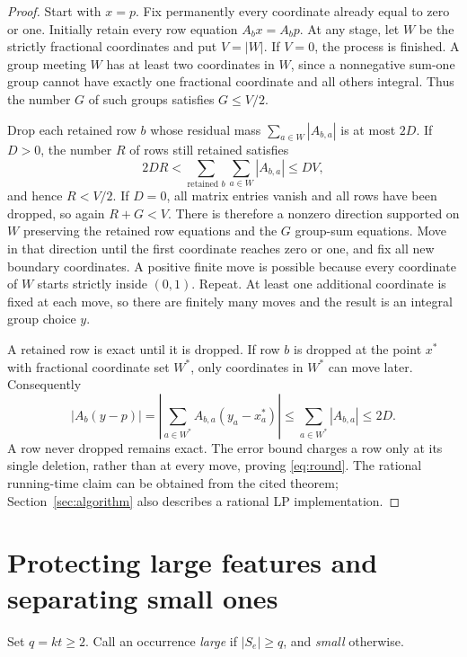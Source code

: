 \documentclass[acmsmall,11pt,nonacm]{acmart}
\begin{document}
\begin{proof}
Start with $x=p$. Fix permanently every coordinate already equal to zero
or one. Initially retain every row equation $A_bx=A_bp$. At any stage,
let $W$ be the strictly fractional coordinates and put $V=|W|$. If
$V=0$, the process is finished. A group meeting $W$ has at least two
coordinates in $W$, since a nonnegative sum-one group cannot have exactly
one fractional coordinate and all others integral. Thus the number $G$
of such groups satisfies $G\le V/2$.

Drop each retained row $b$ whose residual mass
$\sum_{a\in W}|A_{b,a}|$ is at most $2D$. If $D>0$, the number $R$ of
rows still retained satisfies
\[
 2DR < \sum_{\text{retained }b}\sum_{a\in W}|A_{b,a}|
       \le DV,
\]
and hence $R<V/2$. If $D=0$, all matrix entries vanish and all rows have
been dropped, so again $R+G<V$. There is therefore a nonzero direction
supported on $W$ preserving the retained row equations and the $G$
group-sum equations. Move in that direction until the first coordinate
reaches zero or one, and fix all new boundary coordinates. A positive
finite move is possible because every coordinate of $W$ starts strictly
inside $(0,1)$. Repeat. At least one additional coordinate is fixed at
each move, so there are finitely many moves and the result is an integral
group choice $y$.

A retained row is exact until it is dropped. If row $b$ is dropped at
the point $x^*$ with fractional coordinate set $W^*$, only coordinates
in $W^*$ can move later. Consequently
\[
 |A_b(y-p)|
 =\left|\sum_{a\in W^*}A_{b,a}(y_a-x^*_a)\right|
 \le \sum_{a\in W^*}|A_{b,a}|\le 2D.
\]
A row never dropped remains exact. The error bound charges a row only at
its single deletion, rather than at every move, proving \eqref{eq:round}.
The rational running-time claim can be obtained from the cited theorem;
Section~\ref{sec:algorithm} also describes a rational LP implementation.
\end{proof}

\section{Protecting large features and separating small ones}
\label{sec:blocks}

Set $q=kt\ge2$. Call an occurrence \emph{large} if $|S_e|\ge q$, and
\emph{small} otherwise.
\end{document}
